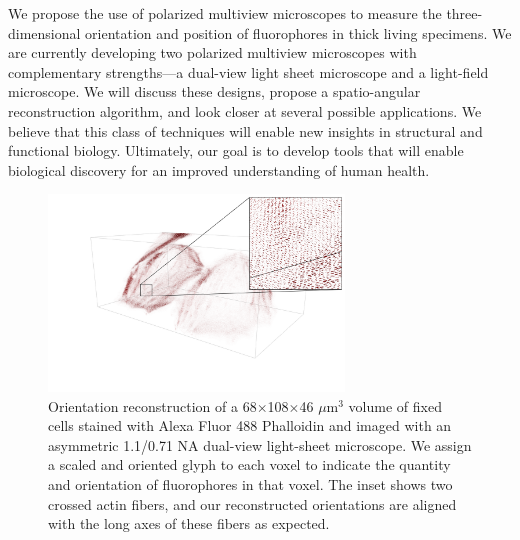 \documentclass[11pt]{article}
\begin{document}
We propose the use of polarized multiview microscopes to measure the
three-dimensional orientation and position of fluorophores in thick living
specimens. We are currently developing two polarized multiview microscopes with
complementary strengths---a dual-view light sheet microscope and a light-field
microscope. We will discuss these designs, propose a spatio-angular
reconstruction algorithm, and look closer at several possible applications. We
believe that this class of techniques will enable new insights in structural and
functional biology. Ultimately, our goal is to develop tools that will enable
biological discovery for an improved understanding of human health.
\begin{figure}[H]
 \centering
 \includegraphics[width=0.70\textwidth, trim={3em 0em 0em 0em}]{../figs/inset}
 \vspace{-4em}
 \caption{Orientation reconstruction of a 68$\times$108$\times$46 $\mu$m${}^3$
   volume of fixed cells stained with Alexa Fluor 488 Phalloidin and imaged with
   an asymmetric 1.1/0.71 NA dual-view light-sheet microscope. We assign a
   scaled and oriented glyph to each voxel to indicate the quantity and
   orientation of fluorophores in that voxel. The inset shows two crossed actin
   fibers, and our reconstructed orientations are aligned with the long axes of
   these fibers as expected. } \label{fig:recon}
\end{figure}

\setlength{}
\printbibliography[heading=none]



\end{document}
